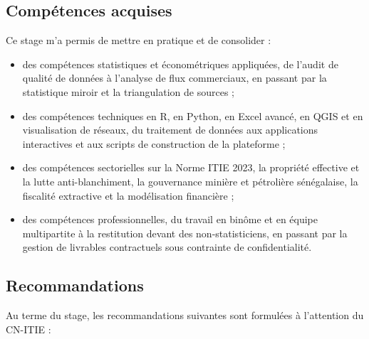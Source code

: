 \documentclass[12pt, a4paper]{article}
\begin{document}
\subsection{Compétences acquises}

Ce stage m'a permis de mettre en pratique et de consolider :

\begin{itemize}
  \item des compétences statistiques et économétriques appliquées, de l'audit
  de qualité de données à l'analyse de flux commerciaux, en passant par la
  statistique miroir et la triangulation de sources ;
  \item des compétences techniques en R, en Python, en Excel avancé, en QGIS
  et en visualisation de réseaux, du traitement de données aux applications
  interactives et aux scripts de construction de la plateforme ;
  \item des compétences sectorielles sur la Norme ITIE 2023, la propriété
  effective et la lutte anti-blanchiment, la gouvernance minière et pétrolière
  sénégalaise, la fiscalité extractive et la modélisation financière ;
  \item des compétences professionnelles, du travail en binôme et en
  équipe multipartite à la restitution devant des non-statisticiens, en passant
  par la gestion de livrables contractuels sous contrainte de confidentialité.
\end{itemize}

\subsection{Recommandations}

Au terme du stage, les recommandations suivantes sont formulées à l'attention
du CN-ITIE :
\end{document}
